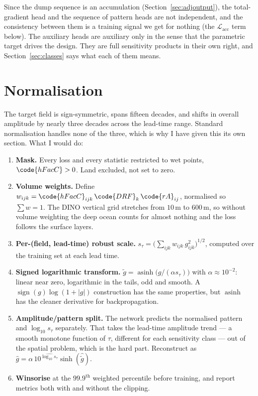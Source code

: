 Since the dump sequence is an accumulation
(Section~\ref{sec:adjoutput}), the total-gradient head
and the sequence of pattern heads are not independent, and the consistency
between them is a training signal we get for nothing (the
$\mathcal{L}_{\text{acc}}$ term below). The auxiliary heads are auxiliary only
in the sense that the parametric target drives the design. They are full
sensitivity products in their own right, and Section~\ref{sec:classes} says
what each of them means.

\section{Normalisation}
\label{sec:norm}

The target field is sign-symmetric, spans fifteen decades, and shifts in
overall amplitude by nearly three decades across the lead-time range. Standard
normalisation handles none of the three, which is why I have given this its own
section. What I would do:

\begin{enumerate}
  \item \textbf{Mask.} Every loss and every statistic restricted to wet points,
        $\code{hFacC}>0$. Land excluded, not set to zero.
  \item \textbf{Volume weights.} Define
        $w_{ijk} = \code{hFacC}_{ijk}\,\code{DRF}_k\,\code{rA}_{ij}$, normalised
        so $\sum w = 1$. The DINO vertical grid stretches from $10\,\mathrm{m}$
        to $600\,\mathrm{m}$, so without volume weighting the deep ocean counts
        for almost nothing and the loss follows the surface layers.
  \item \textbf{Per-(field, lead-time) robust scale.}
        $s_\tau = \big(\sum_{ijk} w_{ijk}\,g_{ijk}^{2}\big)^{1/2}$, computed
        over the training set at each lead time.
  \item \textbf{Signed logarithmic transform.}
        $\tilde{g} = \operatorname{asinh}\!\big(g/(\alpha s_\tau)\big)$ with
        $\alpha\approx10^{-2}$: linear near zero, logarithmic in the tails, odd
        and smooth. A $\operatorname{sign}(g)\log(1+|g|)$ construction has the
        same properties, but $\operatorname{asinh}$ has the cleaner derivative
        for backpropagation.
  \item \textbf{Amplitude/pattern split.} The network predicts the normalised
        pattern and $\log_{10}s_\tau$ separately. That takes the lead-time
        amplitude trend --- a smooth monotone function of $\tau$, different for
        each sensitivity class --- out of the spatial problem, which is the hard
        part. Reconstruct as
        $\hat{g} = \alpha\,10^{\widehat{\log_{10}s_\tau}}\sinh(\hat{\tilde{g}})$.
  \item \textbf{Winsorise} at the $99.9^{\text{th}}$ weighted percentile before
        training, and report metrics both with and without the clipping.
\end{enumerate}

